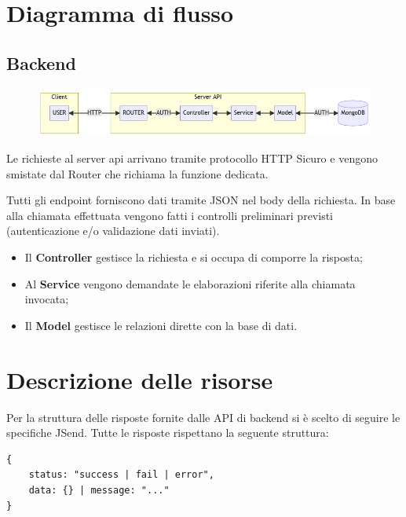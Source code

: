 \documentclass[a4paper]{report}
\begin{document}
\section{Diagramma di flusso}
\subsection{Backend}
\begin{figure}[H]
        \centering
        \includegraphics[width=1.0\textwidth]{figures/architectures/apiFlowChart}
    \end{figure}
Le richieste al server api arrivano tramite protocollo HTTP Sicuro e vengono smistate dal Router che richiama la funzione dedicata. 


Tutti gli endpoint forniscono dati tramite JSON nel body della richiesta. In base alla chiamata effettuata vengono fatti i controlli preliminari previsti (autenticazione e/o validazione dati inviati). 
\begin{itemize}
    \item Il \textbf{Controller} gestisce la richiesta e si occupa di comporre la risposta;
    \item Al \textbf{Service} vengono demandate le elaborazioni riferite alla chiamata invocata;
    \item Il \textbf{Model} gestisce le relazioni dirette con la base di dati.
\end{itemize}
\section{Descrizione delle risorse}

Per la struttura delle risposte fornite dalle API di backend si è scelto di seguire le specifiche JSend\cite{jsend}. Tutte le risposte rispettano la seguente struttura:

\begin{verbatim}
{
    status: "success | fail | error",
    data: {} | message: "..."
}
\end{verbatim}
\end{document}
